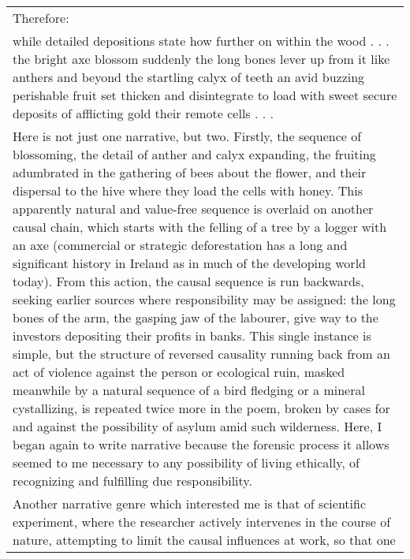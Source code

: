 \begin{longtable}[]{@{}l@{}}
\begin{minipage}[t]{0.97\columnwidth}
Therefore:\strut
\end{minipage}\tabularnewline
\begin{minipage}[t]{0.97\columnwidth}\raggedright
\textbar{} while detailed depositions state \textbar{} how further on
\textbar{} within the wood \textbar{} . . . \textbar{} \textbar{}
\textbar{} the bright axe \textbar{} blossom suddenly \textbar{}
\textbar{} \textbar{} the long bones lever \textbar{} up from it like
anthers \textbar{} and beyond the startling \textbar{} calyx of teeth
\textbar{} \textbar{} \textbar{} an avid buzzing perishable \textbar{}
fruit set thicken \textbar{} and disintegrate \textbar{} to load with
sweet \textbar{} \textbar{} \textbar{} secure deposits \textbar{} of
afflicting gold \textbar{} their remote cells . . .\strut
\end{minipage}\tabularnewline
\begin{minipage}[t]{0.97\columnwidth}\raggedright
Here is not just one narrative, but two. Firstly, the sequence of
blossoming, the detail of anther and calyx expanding, the fruiting
adumbrated in the gathering of bees about the flower, and their
dispersal to the hive where they load the cells with honey. This
apparently natural and value-free sequence is overlaid on another causal
chain, which starts with the felling of a tree by a logger with an axe
(commercial or strategic deforestation has a long and significant
history in Ireland as in much of the developing world today). From this
action, the causal sequence is run backwards, seeking earlier sources
where responsibility may be assigned: the long bones of the arm, the
gasping jaw of the labourer, give way to the investors depositing their
profits in banks. This single instance is simple, but the structure of
reversed causality running back from an act of violence against the
person or ecological ruin, masked meanwhile by a natural sequence of a
bird fledging or a mineral cystallizing, is repeated twice more in the
poem, broken by cases for and against the possibility of asylum amid
such wilderness. Here, I began again to write narrative because the
forensic process it allows seemed to me necessary to any possibility of
living ethically, of recognizing and fulfilling due
responsibility.\strut
\end{minipage}\tabularnewline
\begin{minipage}[t]{0.97\columnwidth}\raggedright
Another narrative genre which interested me is that of scientific
experiment, where the researcher actively intervenes in the course of
nature, attempting to limit the causal influences at work, so that one

\end{minipage}
\end{longtable}
